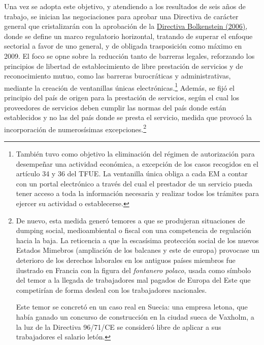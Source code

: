 \documentclass[10pt,a4paper]{article}
\begin{document}
Una vez se adopta este objetivo, y atendiendo a los resultados de seis años de trabajo, se inician las negociaciones para aprobar una Directiva de carácter general que cristalizarán con la aprobación de la \href{https://www.boe.es/doue/2006/376/L00036-00068.pdf}{Directiva Bolkenstein (2006)}, donde se define un marco regulatorio horizontal, tratando de superar el enfoque sectorial a favor de uno general, y de obligada trasposición como máximo en 2009. El foco se opne sobre la reducción tanto de barreras legales, reforzando los principios de libertad de establecimiento de libre prestación de servicios y de reconocimiento mutuo, como las barreras burocráticas y administrativas, mediante la creación de ventanillas únicas electrónicas.\footnote{%
    También tuvo como objetivo la eliminación del régimen de autorización para desempeñar una actividad económica, a excepción de los casos recogidos en el artículo 34 y 36 del TFUE. La ventanilla única obliga a cada EM a contar con un portal electrónico a través del cual el prestador de un servicio pueda tener acceso a toda la información necesaria y realizar todos los trámites para ejercer su actividad o establecerse.
} Además, se fijó el principio del país de origen para la prestación de servicios, según el cual los proveedores de servicios deben cumplir las normas del país donde están establecidos y no las del país donde se presta el servicio, medida que provocó la incorporación de numerosísimas excepciones.\footnote{%
    De nuevo, esta medida generó temores a que se produjeran situaciones de dumping social, medioambiental o fiscal con una competencia de regulación hacia la baja. La reticencia a que la escasísima protección social de los nuevos Estados Mimebros (ampliación de los balcanes y este de europa) provocase un deterioro de los derechos laborales en los antiguos países miembros fue ilustrado en Francia con la figura del \textit{fontanero polaco}, usada como símbolo del temor a la llegada de trabajadores mal pagados de Europa del Este que competirían de forma desleal con los trabajadores nacionales.

Este temor se concretó en un caso real en Suecia: una empresa letona, que había ganado un concurso de construcción en la ciudad sueca de Vaxholm, a la luz de la Directiva 96/71/CE se consideró libre de aplicar a sus trabajadores el salario letón.
} 
\end{document}

